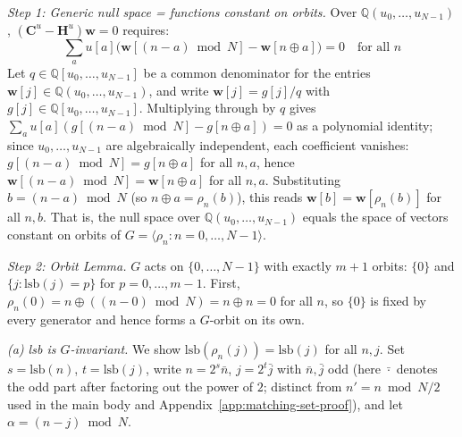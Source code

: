 \documentclass[10pt,a4paper]{amsart}
\begin{document}
\medskip
\noindent\textit{Step 1: Generic null space = functions constant on orbits.} Over $\mathbb{Q}(u_0,\ldots,u_{N-1})$, $(\mathbf{C}^u - \mathbf{H}^u)\mathbf{w} = 0$ requires:
\[
\sum_a u[a]\bigl(\mathbf{w}[(n-a)\bmod N] - \mathbf{w}[n\oplus a]\bigr) = 0 \quad\text{for all }n
\]
Let $q \in \mathbb{Q}[u_0,\ldots,u_{N-1}]$ be a common denominator for the entries $\mathbf{w}[j] \in \mathbb{Q}(u_0,\ldots,u_{N-1})$, and write $\mathbf{w}[j] = g[j]/q$ with $g[j] \in \mathbb{Q}[u_0,\ldots,u_{N-1}]$. Multiplying through by $q$ gives $\sum_a u[a](g[(n-a)\bmod N] - g[n\oplus a]) = 0$ as a polynomial identity; since $u_0,\ldots,u_{N-1}$ are algebraically independent, each coefficient vanishes: $g[(n-a)\bmod N] = g[n\oplus a]$ for all $n,a$, hence $\mathbf{w}[(n-a)\bmod N] = \mathbf{w}[n\oplus a]$ for all $n,a$. Substituting $b = (n-a)\bmod N$ (so $n\oplus a = \rho_n(b)$), this reads $\mathbf{w}[b] = \mathbf{w}[\rho_n(b)]$ for all $n,b$. That is, the null space over $\mathbb{Q}(u_0,\ldots,u_{N-1})$ equals the space of vectors constant on orbits of $G = \langle\rho_n : n = 0,\ldots,N-1\rangle$.

\medskip
\noindent\textit{Step 2: Orbit Lemma.} $G$ acts on $\{0,\ldots,N-1\}$ with exactly $m+1$ orbits: $\{0\}$ and $\{j : \mathrm{lsb}(j) = p\}$ for $p = 0,\ldots,m-1$. First, $\rho_n(0) = n \oplus ((n-0)\bmod N) = n \oplus n = 0$ for all $n$, so $\{0\}$ is fixed by every generator and hence forms a $G$-orbit on its own.

\smallskip
\emph{(a) lsb is $G$-invariant.} We show $\mathrm{lsb}(\rho_n(j)) = \mathrm{lsb}(j)$ for all $n,j$. Set $s = \mathrm{lsb}(n)$, $t = \mathrm{lsb}(j)$, write $n = 2^s \bar{n}$, $j = 2^t \bar{j}$ with $\bar{n},\bar{j}$ odd (here $\bar{\cdot}$ denotes the odd part after factoring out the power of $2$; distinct from $n' = n\bmod N/2$ used in the main body and Appendix~\ref{app:matching-set-proof}), and let $\alpha = (n-j)\bmod N$.
\end{document}
